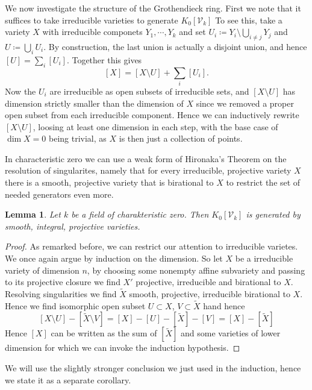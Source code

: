 \documentclass[11pt, a4paper, german]{article}
\theoremstyle{plain}
\newtheorem{lemma}[theorem]{Lemma}
\theoremstyle{definition}
\newcommand{\gring}[1][k]{K_0[\mathcal{V}_#1]}
\begin{document}
We now investigate the structure of the Grothendieck ring. First we note that it suffices to take irreducible varieties to generate $\gring[k]$
To see this, take a variety $X$ with irreducible componets $Y_1, \cdots, Y_k$ and set ${U_i \coloneqq Y_i \setminus \bigcup_{i \neq j} Y_j}$ and
$U \coloneqq \bigcup_i U_i$. By construction, the last union is actually a disjoint union, and hence $[U] = \sum_i [U_i]$. Together this gives
\[
    [X] = [X \setminus U] + \sum_i [U_i].
\] Now the $U_i$ are irreducible as open subsets of irreducible sets, and $[X \setminus U]$ has dimension
strictly smaller than the dimension of $X$ since we removed a proper open subset from each irreducible component. Hence we can inductively
rewrite $[X \setminus U]$, loosing at least one dimension in each step, with the base case of $\dim  X = 0$ being trivial, as $X$ is then
just a collection of points.

In characteristic zero we can use a weak form of Hironaka's Theorem on the resolution of singularites, namely that for every irreducible, 
projective variety $X$ there is a smooth, projective variety that is birational to $X$ to restrict the set of needed generators even more. 


\begin{lemma}
    Let $k$ be a field of charakteristic zero. Then $\gring[k]$ is generated by smooth, integral, projective varieties.
\end{lemma}
\begin{proof}
    As remarked before, we can restrict our attention to irreducible varietes.  We once again argue by induction on the dimension.
    So let $X$ be a irreducible variety of dimension $n$, by choosing some nonempty affine subvariety and passing to its projective closure we
    find $X'$ projective, irreducible and birational to $X$. Resolving singularities we find $\widetilde{X}$ smooth, projective, irreducible
    birational to $X$. Hence we find isomorphic open subset $U \subset X$, $V \subset \widetilde{X}$ hand hence
    \[
        [X \setminus U ] - [\widetilde{X} \setminus V] = [X] - [U] - [\widetilde{X}] - [V] = [X] - [\widetilde{X}]
    \]
    Hence $[X]$ can be written as the sum of $[\widetilde{X}]$ and some varieties of lower dimension for which we can invoke the induction
    hypothesis.
\end{proof}

We will use the slightly stronger conclusion we just used in the induction, hence we state it as a separate corollary.
\end{document}
